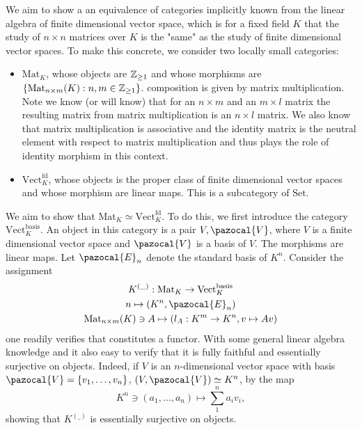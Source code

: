     \begin{example}
        We aim to show a an equivalence of categories implicitly known from the linear algebra of finite dimensional vector space, which is for a fixed field $K$ that the study of $n\times n$ matrices over $K$ is the "same" as the study of finite dimensional vector spaces. To make this concrete, we consider two locally small categories:
        \begin{itemize}
            \item $\mathrm{Mat}_K$, whose objects are $\mathbb{Z}_{\geq 1}$ and whose morphisms are $\{\mathrm{Mat}_{n\times m}(K) : n,m\in \mathbb{Z}_{\geq 1}\}$. composition is given by matrix multiplication. Note we know (or will know) that for an $n\times m$ and an $m\times l$ matrix the resulting matrix from matrix multiplication is an $n\times l$ matrix. We also know that matrix multiplication is associative and the identity matrix is the neutral element with respect to matrix multiplication and thus plays the role of identity morphism in this context.
            \item $\mathrm{Vect}^{\mathrm{fd}}_K$, whose objects is the proper class of finite dimensional vector spaces and whose morphism are linear maps. This is a subcategory of $\mathrm{Set}$.  
        \end{itemize}    
        We aim to show that $\mathrm{Mat}_K\simeq \mathrm{Vect}^{\mathrm{fd}}_K$. To do this, we first introduce the category $\mathrm{Vect}_K^{\mathrm{basis}}$. An object in this category is a pair $V,\pazocal{V}$, where $V$ is a finite dimensional vector space and $\pazocal{V}$ is a basis of $V$. The morphisms are linear maps. Let $\pazocal{E}_n$ denote the standard basis of $K^n$. Consider the assignment
        \begin{gather*}
            K^{(\_)} : \mathrm{Mat}_K \rightarrow \mathrm{Vect}^{\mathrm{basis}}_K\\
            n \mapsto (K^n,\pazocal{E}_n)\\
            \mathrm{Mat}_{n\times m}(K)\ni A \mapsto (l_A : K^m\rightarrow K^n, v\mapsto A v)
        \end{gather*}  
        one readily verifies that constitutes a functor. With some general linear algebra knowledge and it also easy to verify that it is fully faithful and essentially surjective on objects. Indeed, if $V$ is an $n$-dimensional vector space with basis $\pazocal{V}=\{v_1,\dots,v_n\}$, $(V,\pazocal{V})\simeq K^n$, by the map 
        $$K^n\ni (a_1,\dots,a_n)\mapsto \sum_1^n a_iv_i,$$
        showing that $K^{(\_)}$ is essentially surjective on objects.\\ 

\end{example}
